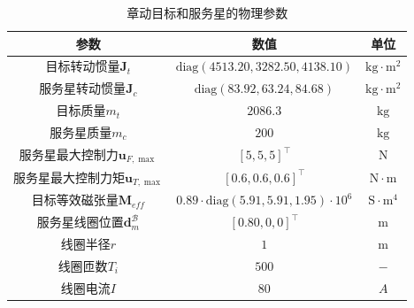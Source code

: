 \documentclass[lang=chs, degree=master, blindreview=false, winfonts=true]{yanputhesis}
\begin{document}
\begin{table}[!htb]
	\caption{章动目标和服务星的物理参数}
	\label{Table_phi_para}
	\centering
	\begin{tabularx}{\textwidth}{CCC}
		\toprule
		参数 									      & 数值 					& 单位 					  \\
		\midrule
		目标转动惯量$\boldsymbol{J}_{t}$		&	$\mathrm{diag}(4513.20,3282.50,4138.10)$	    	&	$\mathrm{kg\cdot m^2}$		\\
		服务星转动惯量$\boldsymbol{J}_{c}$		&	$\mathrm{diag}(83.92,63.24,84.68)$	    	&	$\mathrm{kg\cdot m^2}$		\\
		目标质量$m_{t}$		                &	$2086.3$	                                   	&	$\mathrm{kg}$		\\
		服务星质量$m_{c}$		                &	$200$	                                     	&	$\mathrm{kg}$		\\
		服务星最大控制力$\boldsymbol{u}_{F,\max}$    &  ${\left[5,5,5\right]^{\top}}$        &        $\mathrm{N}$  \\
		服务星最大控制力矩$\boldsymbol{u}_{T,\max}$    &  ${\left[0.6,0.6,0.6\right]^{\top}}$        &        $\mathrm{N\cdot m}$  \\
		目标等效磁张量$\boldsymbol{M}_{eff}$	&	$0.89\cdot\mathrm{diag}(5.91,5.91,1.95)\cdot 10^6$	 	&	$\mathrm{S\cdot m^4}$		\\
		服务星线圈位置$\boldsymbol{d}_{m}^{\mathcal{B}}$	 &	${\left[0.80,0,0\right]^{\top}}$	    	&	$\mathrm{m}$		        \\
		线圈半径$r$			     	&	$1$							 	&	$\mathrm{m}$				\\
		线圈匝数$T_i$			&	$500$									&	$-$							\\
		线圈电流$I$					&	$80$								&	$A$							\\
		\bottomrule
	\end{tabularx}
\end{table}
\end{document}
